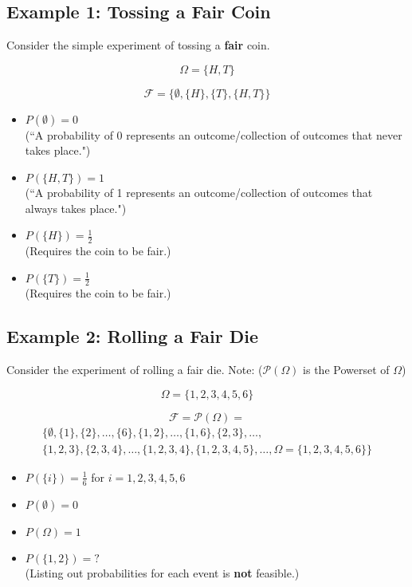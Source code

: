 \documentclass{article}
\begin{document}
\pagebreak

\subsection*{Example 1: Tossing a Fair Coin}
Consider the simple experiment of tossing a \textbf{fair} coin.

\[
\Omega = \{H, T\}
\]

\[
\mathcal{F} = \{\emptyset, \{H\}, \{T\}, \{H, T\}\}
\]

\begin{itemize}
    \item \(P(\emptyset) = 0\) \\
    (``A probability of 0 represents an outcome/collection of outcomes that never takes place.")
    
    \item \(P(\{H, T\}) = 1\) \\
    (``A probability of 1 represents an outcome/collection of outcomes that always takes place.")
    
    \item \(P(\{H\}) = \frac{1}{2}\) \\
    (Requires the coin to be fair.)
    
    \item \(P(\{T\}) = \frac{1}{2}\) \\
    (Requires the coin to be fair.)
\end{itemize}

\subsection*{Example 2: Rolling a Fair Die}
Consider the experiment of rolling a fair die. Note: (\(\mathcal{P}(\Omega)\) is the Powerset of \(\Omega\))

\[
\Omega = \{1, 2, 3, 4, 5, 6\}
\]

\[
\mathcal{F} = \mathcal{P}(\Omega) =
\]
\[
\begin{aligned}
\{\emptyset, \{1\}, \{2\}, \ldots, \{6\}, \{1, 2\}, \ldots, \{1, 6\}, \{2, 3\}, \ldots, \\
\{1, 2, 3\}, \{2, 3, 4\}, \ldots, \{1, 2, 3, 4\}, \{1, 2, 3, 4, 5\}, \ldots, \Omega = \{1, 2, 3, 4, 5, 6\}\}
\end{aligned}
\]

\begin{itemize}
    \item \(P(\{i\}) = \frac{1}{6}\) for \(i = 1, 2, 3, 4, 5, 6\)
    \item \(P(\emptyset) = 0\)
    \item \(P(\Omega) = 1\)
    \item \(P(\{1, 2\}) = ?\) \\
    (Listing out probabilities for each event is \textbf{not} feasible.)
\end{itemize}
\end{document}

